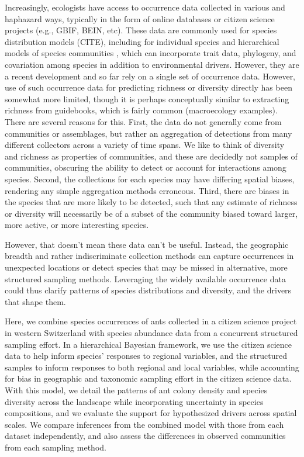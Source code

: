 \documentclass[preprint,review,times,12pt]{elsarticle}
\begin{document}
Increasingly, ecologists have access to occurrence data collected in various and haphazard ways, typically in the form of online databases or citizen science projects (e.g., GBIF, BEIN, etc). These data are commonly used for species distribution models (CITE), including for individual species and hierarchical models of species communities \citep{Ovaskainen2017}, which can incorporate trait data, phylogeny, and covariation among species in addition to environmental drivers. However, they are a recent development and so far rely on a single set of occurrence data. However, use of such occurrence data for predicting richness or diversity directly has been somewhat more limited, though it is perhaps conceptually similar to extracting richness from guidebooks, which is fairly common (macroecology examples). There are several reasons for this. First, the data do not generally come from communities or assemblages, but rather an aggregation of detections from many different collectors across a variety of time spans. We like to think of diversity and richness as properties of communities, and these are decidedly not samples of communities, obscuring the ability to detect or account for interactions among species. Second, the collections for each species may have differing spatial biases, rendering any simple aggregation methods erroneous. Third, there are biases in the species that are more likely to be detected, such that any estimate of richness or diversity will necessarily be of a subset of the community biased toward larger, more active, or more interesting species.

However, that doesn't mean these data can't be useful. Instead, the geographic breadth and rather indiscriminate collection methods can capture occurrences in unexpected locations or detect species that may be missed in alternative, more structured sampling methods. Leveraging the widely available occurrence data could thus clarify patterns of species distributions and diversity, and the drivers that shape them.

Here, we combine species occurrences of ants collected in a citizen science project in western Switzerland with species abundance data from a concurrent structured sampling effort. In a hierarchical Bayesian framework, we use the citizen science data to help inform species' responses to regional variables, and the structured samples to inform responses to both regional and local variables, while accounting for bias in geographic and taxonomic sampling effort in the citizen science data. With this model, we detail the patterns of ant colony density and species diversity across the landscape while incorporating uncertainty in species compositions, and we evaluate the support for hypothesized drivers across spatial scales. We compare inferences from the combined model with those from each dataset independently, and also assess the differences in observed communities from each sampling method. 
\end{document}
